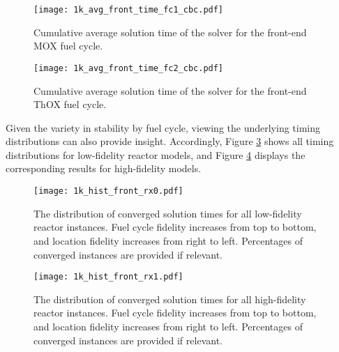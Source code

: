 \begin{figure}[h!]
  \begin{center}
    \texttt{[image: 1k\_avg\_front\_time\_fc1\_cbc.pdf]}
    \caption{
      \label{fig:1k_avg_front_time_fc1_cbc}
      Cumulative average solution time of the \cbc solver for the front-end MOX
      fuel cycle.}
  \end{center}
\end{figure}

\begin{figure}[h!]
  \begin{center}
    \texttt{[image: 1k\_avg\_front\_time\_fc2\_cbc.pdf]}
    \caption{
      \label{fig:1k_avg_front_time_fc2_cbc}
      Cumulative average solution time of the \cbc solver for the front-end ThOX
      fuel cycle.}
  \end{center}
\end{figure}

Given the variety in stability by fuel cycle, viewing the underlying timing
distributions can also provide insight. Accordingly, Figure
\ref{fig:1k_hist_front_rx0} shows all timing distributions for low-fidelity
reactor models, and Figure \ref{fig:1k_hist_front_rx1} displays the
corresponding results for high-fidelity models.

\begin{figure}[h!]
  \begin{center}
    \texttt{[image: 1k\_hist\_front\_rx0.pdf]}
    \caption{
      \label{fig:1k_hist_front_rx0}
      The distribution of converged solution times for all low-fidelity reactor
      instances. Fuel cycle fidelity increases from top to bottom, and location
      fidelity increases from right to left. Percentages of converged instances
      are provided if relevant.}
  \end{center}
\end{figure}

\begin{figure}[h!]
  \begin{center}
    \texttt{[image: 1k\_hist\_front\_rx1.pdf]}
    \caption{
      \label{fig:1k_hist_front_rx1}
      The distribution of converged solution times for all high-fidelity reactor
      instances. Fuel cycle fidelity increases from top to bottom, and location
      fidelity increases from right to left. Percentages of converged instances
      are provided if relevant.}
  \end{center}
\end{figure}

